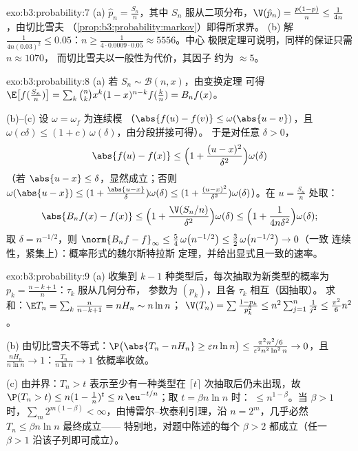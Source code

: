\begin{solution}{exo:b3:probability:7}
(a) $\hat p_n = \frac{S_n}n$，其中 $S_n$ 服从二项分布，$\V(\hat
p_n) = \frac{p(1-p)}n \leq \frac1{4n}$，由切比雪夫
（\cref{prop:b3:probability:markov}）即得所求界。
(b) 解 $\frac1{4n(0.03)^2} \leq 0.05$：$n \geq
\frac{1}{4\cdot0.0009\cdot0.05} \approx 5556$。中心
极限定理可说明，同样的保证只需 $n \approx 1070$，
而切比雪夫以一般性为代价，其因子
约为 $\approx 5$。
\end{solution}

\begin{solution}{exo:b3:probability:8}
(a) 若 $S_n \sim \mathcal B(n, x)$，由变换定理
可得 $\E\bigl[f(\frac{S_n}n)\bigr] =
\sum_k\binom nkx^k(1-x)^{n-k}f(\frac kn) = B_nf(x)$。

(b)--(c) 设 $\omega = \omega_f$ 为连续模
（$\abs{f(u) - f(v)} \leq \omega(\abs{u - v})$，且 $\omega(c
\delta) \leq (1 + c)\,\omega(\delta)$，由分段拼接可得）。
于是对任意 $\delta > 0$，
\[
\abs{f(u) - f(x)} \leq \Bigl(1 + \frac{(u -
x)^2}{\delta^2}\Bigr)\omega(\delta)
\]
（若 $\abs{u - x} \leq \delta$，显然成立；否则
$\omega(\abs{u-x}) \leq (1 + \frac{\abs{u-x}}\delta)
\omega(\delta) \leq (1 + \frac{(u-x)^2}{\delta^2})
\omega(\delta)$）。在 $u = \frac{S_n}n$ 处取：
\[
\abs{B_nf(x) - f(x)} \leq
\Bigl(1 + \frac{\V(S_n/n)}{\delta^2}\Bigr)\omega(\delta)
\leq \Bigl(1 + \frac{1}{4n\delta^2}\Bigr)\omega(\delta) ;
\]
取 $\delta = n^{-1/2}$，则 $\norm{B_nf - f}_\infty \leq
\frac54\,\omega\bigl(n^{-1/2}\bigr) \leq
\frac32\,\omega\bigl(n^{-1/2}\bigr) \to 0$（一致
连续性，紧集上）：概率形式的魏尔斯特拉斯
定理，并给出显式且一致的速率。
\end{solution}

\begin{solution}{exo:b3:probability:9}
(a) 收集到 $k - 1$ 种类型后，每次抽取为新类型的概率为
$p_k = \frac{n-k+1}n$：$\tau_k$ 服从几何分布，
参数为 $(p_k)$，且各 $\tau_k$ 相互（因抽取）。
求和：$\E T_n = \sum_k\frac n{n-k+1} = nH_n \sim n\ln n$；
$\V(T_n) = \sum\frac{1 - p_k}{p_k^2} \leq
n^2\sum_{j=1}^n\frac1{j^2} \leq \frac{\pi^2}6n^2$。

(b) 由切比雪夫不等式：$\P\bigl(\abs{T_n - nH_n} \geq \varepsilon
n\ln n\bigr) \leq \frac{\pi^2n^2/6}{\varepsilon^2n^2\ln^2n}
\to 0$，且 $\frac{nH_n}{n\ln n} \to 1$：$\frac{T_n}{n\ln n}
\to 1$ 依概率收敛。

(c) 由并界：$T_n > t$ 表示至少有一种类型在
$\lceil t\rceil$ 次抽取后仍未出现，故 $\P(T_n > t) \leq n(1 -
\frac1n)^{t} \leq n\,\eu^{-t/n}$；取 $t = \beta n\ln n$ 时：
$\leq n^{1 - \beta}$。当 $\beta > 1$ 时，$\sum_m
2^{m(1-\beta)} < \infty$，由博雷尔–坎泰利引理，沿 $n =
2^m$，几乎必然 $T_n \leq \beta n\ln n$ 最终成立——
特别地，对题中陈述的每个 $\beta > 2$ 都成立（任一 $\beta > 1$
沿该子列即可成立）。
\end{solution}

